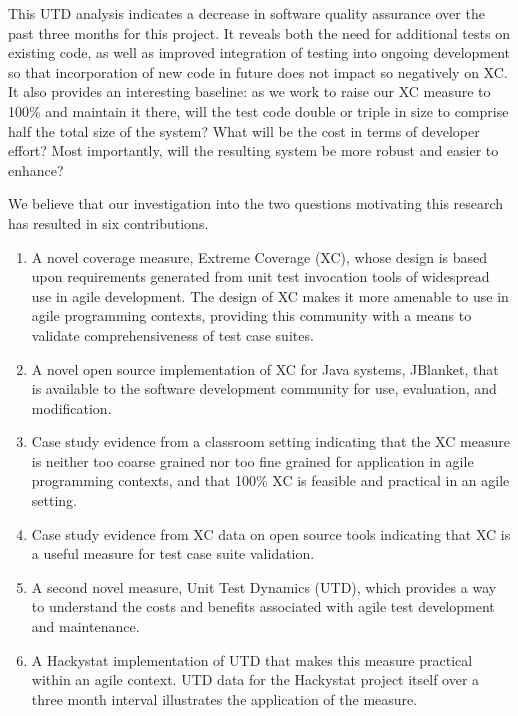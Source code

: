 \documentclass[10pt,twocolumn]{article}
\begin{document}
This UTD analysis indicates a decrease in software quality assurance over
the past three months for this project. It reveals both the need for
additional tests on existing code, as well as improved integration of
testing into ongoing development so that incorporation of new code in
future does not impact so negatively on XC.  It also provides an
interesting baseline: as we work to raise our XC measure to 100\% and
maintain it there, will the test code double or triple in size to
comprise half the total size of the system? What will be the cost in terms
of developer effort?  Most importantly, will the resulting system be more
robust and easier to enhance? 

\label{sec:Contributions}

We believe that our investigation into the two questions motivating this
research has resulted in six contributions. 

\begin{enumerate}
\item A novel
coverage measure, Extreme Coverage (XC), whose design is based upon
requirements generated from unit test invocation tools of widespread use in
agile development.  The design of XC makes it more amenable to use in agile
programming contexts, providing this community with a means to validate
comprehensiveness of test case suites.  

\item A novel open
source implementation of XC for Java systems, JBlanket, that is
available to the software development community for use, evaluation, and
modification. 

\item Case study evidence from a classroom
setting indicating that the XC measure is neither too coarse grained nor
too fine grained for application in agile programming contexts, and that
100\% XC is feasible and practical in an agile setting. 

\item Case
study evidence from XC data on open source tools indicating that XC is a useful
measure for test case suite validation. 

\item A second novel
measure, Unit Test Dynamics (UTD), which provides a way to understand the
costs and benefits associated with agile test development and
maintenance. 

\item A Hackystat implementation of UTD that makes this measure
practical within an agile context. UTD data for the Hackystat project
itself over a three month interval illustrates the application of the
measure.

\end{enumerate}
\end{document}
